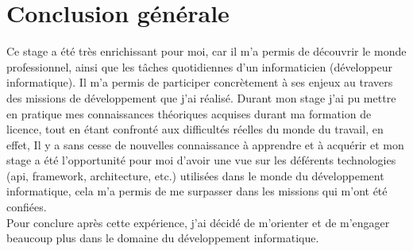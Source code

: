 \section{Conclusion générale}
Ce stage a été très enrichissant pour moi, car il m'a permis de découvrir le monde professionnel, ainsi que les tâches quotidiennes d'un informaticien (développeur informatique).
Il m'a permis de participer concrètement à ses enjeux au travers des missions de développement que j'ai réalisé. Durant mon stage j'ai pu mettre en pratique mes connaissances théoriques acquises durant ma formation de licence, tout en étant confronté aux difficultés réelles du monde du travail, en effet, Il y a sans cesse de nouvelles connaissance à apprendre et à acquérir et mon stage a été l’opportunité pour moi d'avoir une vue sur les déférents technologies (api, framework, architecture, etc.) utilisées dans le monde du développement informatique,  cela m'a permis de me surpasser  dans les missions qui m'ont été confiées.\\

Pour conclure après cette expérience, j'ai décidé de m'orienter et de m'engager beaucoup plus dans le domaine du développement informatique.
